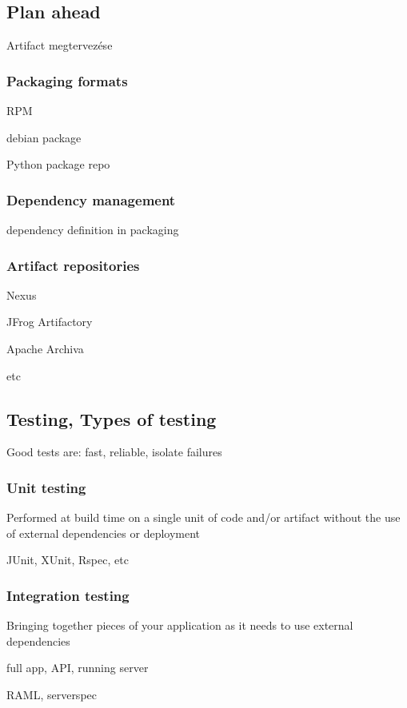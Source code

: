 \documentclass[a4paper,14pt, twocolumn]{extarticle}
\begin{document}
		\subsection{Plan ahead}
			Artifact megtervezése
			\subsubsection{Packaging formats}
			\begin{compactitem}
				\item RPM 
				\item debian package 
				\item Python package repo 
			\end{compactitem}
			\subsubsection{Dependency management}
				dependency definition in packaging
			\subsubsection{Artifact repositories }
				\begin{compactitem}
					\item Nexus 
					\item JFrog Artifactory 
					\item Apache Archiva 
					\item etc
				\end{compactitem}
		\newpage
		\subsection{Testing, Types of testing}
			Good tests are: fast, reliable, isolate failures
			\subsubsection{Unit testing}
				\begin{compactitem}
					\item Performed at build time on a single unit of code and/or artifact without the use of external dependencies or deployment
					\item JUnit, XUnit, Rspec, etc
				\end{compactitem}
			\subsubsection{Integration testing}
				\begin{compactitem}
					\item Bringing together pieces of your application as it needs to use external dependencies 
					\item full app, API, running server 
					\item RAML, serverspec
				\end{compactitem}
\end{document}
